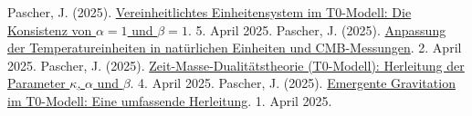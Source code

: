 \documentclass[12pt,a4paper]{article}
\theoremstyle{definition}
\theoremstyle{remark}
\begin{document}
\begin{thebibliography}{99}
		 Pascher, J. (2025). \href{https://github.com/jpascher/T0-Time-Mass-Duality/tree/main/2/pdf/Deutsch/Alpha1Beta1Konsistenz.pdf}{Vereinheitlichtes Einheitensystem im T0-Modell: Die Konsistenz von \(\alpha = 1\) und \(\beta = 1\)}. 5. April 2025.
		 Pascher, J. (2025). \href{https://github.com/jpascher/T0-Time-Mass-Duality/tree/main/2/pdf/Deutsch/NatEinheitenAlpha1.pdf}{Anpassung der Temperatureinheiten in natürlichen Einheiten und CMB-Messungen}. 2. April 2025.
		 Pascher, J. (2025). \href{https://github.com/jpascher/T0-Time-Mass-Duality/tree/main/2/pdf/Deutsch/ZeitMasseT0Params.pdf}{Zeit-Masse-Dualitätstheorie (T0-Modell): Herleitung der Parameter \(\kappa\), \(\alpha\) und \(\beta\)}. 4. April 2025.
		 Pascher, J. (2025). \href{https://github.com/jpascher/T0-Time-Mass-Duality/tree/main/2/pdf/Deutsch/EmergentGravT0.pdf}{Emergente Gravitation im T0-Modell: Eine umfassende Herleitung}. 1. April 2025.
	\end{thebibliography}
	
\end{document}
